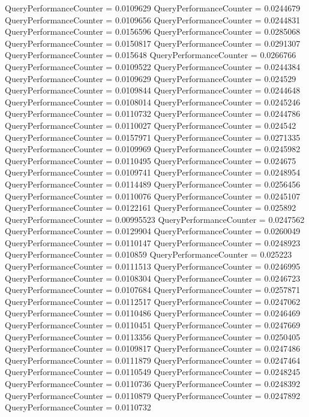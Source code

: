 \documentclass[9pt]{article}
\theoremstyle{plain}
\theoremstyle{definition}
\theoremstyle{remark}
\numberwithin{equation}{section}
\begin{document}
QueryPerformanceCounter  =  0.0109629
QueryPerformanceCounter  =  0.0244679
QueryPerformanceCounter  =  0.0109656
QueryPerformanceCounter  =  0.0244831
QueryPerformanceCounter  =  0.0156596
QueryPerformanceCounter  =  0.0285068
QueryPerformanceCounter  =  0.0150817
QueryPerformanceCounter  =  0.0291307
QueryPerformanceCounter  =  0.015648
QueryPerformanceCounter  =  0.0266766
QueryPerformanceCounter  =  0.0109522
QueryPerformanceCounter  =  0.0244384
QueryPerformanceCounter  =  0.0109629
QueryPerformanceCounter  =  0.024529
QueryPerformanceCounter  =  0.0109844
QueryPerformanceCounter  =  0.0244648
QueryPerformanceCounter  =  0.0108014
QueryPerformanceCounter  =  0.0245246
QueryPerformanceCounter  =  0.0110732
QueryPerformanceCounter  =  0.0244786
QueryPerformanceCounter  =  0.0110027
QueryPerformanceCounter  =  0.024542
QueryPerformanceCounter  =  0.0157971
QueryPerformanceCounter  =  0.0271335
QueryPerformanceCounter  =  0.0109969
QueryPerformanceCounter  =  0.0245982
QueryPerformanceCounter  =  0.0110495
QueryPerformanceCounter  =  0.024675
QueryPerformanceCounter  =  0.0109741
QueryPerformanceCounter  =  0.0248954
QueryPerformanceCounter  =  0.0114489
QueryPerformanceCounter  =  0.0256456
QueryPerformanceCounter  =  0.0110076
QueryPerformanceCounter  =  0.0245107
QueryPerformanceCounter  =  0.0122161
QueryPerformanceCounter  =  0.025892
QueryPerformanceCounter  =  0.00995523
QueryPerformanceCounter  =  0.0247562
QueryPerformanceCounter  =  0.0129904
QueryPerformanceCounter  =  0.0260049
QueryPerformanceCounter  =  0.0110147
QueryPerformanceCounter  =  0.0248923
QueryPerformanceCounter  =  0.010859
QueryPerformanceCounter  =  0.025223
QueryPerformanceCounter  =  0.0111513
QueryPerformanceCounter  =  0.0246995
QueryPerformanceCounter  =  0.0108304
QueryPerformanceCounter  =  0.0246723
QueryPerformanceCounter  =  0.0107684
QueryPerformanceCounter  =  0.0257871
QueryPerformanceCounter  =  0.0112517
QueryPerformanceCounter  =  0.0247062
QueryPerformanceCounter  =  0.0110486
QueryPerformanceCounter  =  0.0246469
QueryPerformanceCounter  =  0.0110451
QueryPerformanceCounter  =  0.0247669
QueryPerformanceCounter  =  0.0113356
QueryPerformanceCounter  =  0.0250405
QueryPerformanceCounter  =  0.0109817
QueryPerformanceCounter  =  0.0247486
QueryPerformanceCounter  =  0.0111879
QueryPerformanceCounter  =  0.0247464
QueryPerformanceCounter  =  0.0110549
QueryPerformanceCounter  =  0.0248245
QueryPerformanceCounter  =  0.0110736
QueryPerformanceCounter  =  0.0248392
QueryPerformanceCounter  =  0.0110879
QueryPerformanceCounter  =  0.0247892
QueryPerformanceCounter  =  0.0110732
\end{document}
